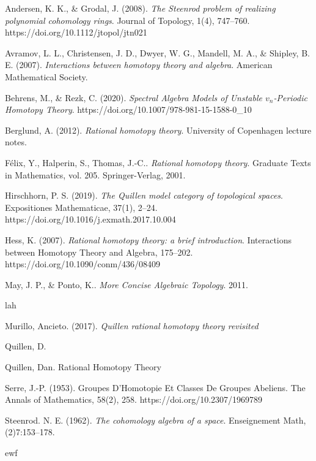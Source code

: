 \documentclass[psamsfonts]{amsart}
\theoremstyle{definition}
\numberwithin{equation}{section}
\begin{document}
\newpage
\begin{thebibliography}{9}

Andersen, K. K., \& Grodal, J. (2008). \textit{The Steenrod problem of realizing polynomial cohomology rings}. Journal of Topology, 1(4), 747–760. https://doi.org/10.1112/jtopol/jtn021 

Avramov, L. L., Christensen, J. D., Dwyer, W. G., Mandell, M. A., \& Shipley, B. E. (2007). \textit{Interactions between homotopy theory and algebra}. American Mathematical Society.

Behrens, M., \& Rezk, C. (2020). \textit{Spectral Algebra Models of Unstable $v_n$-Periodic Homotopy Theory}. https://doi.org/10.1007/978-981-15-1588-0\_10 

Berglund, A. (2012). \textit{Rational homotopy theory}. University of Copenhagen lecture notes.


Félix, Y., Halperin, S., Thomas, J.-C.. \textit{Rational homotopy theory}. Graduate Texts in Mathematics, vol. 205. Springer-Verlag, 2001.


Hirschhorn, P. S. (2019). \textit{The Quillen model category of topological spaces}. Expositiones Mathematicae, 37(1), 2–24. https://doi.org/10.1016/j.exmath.2017.10.004 

Hess, K. (2007). \textit{Rational homotopy theory: a brief introduction}. Interactions between Homotopy Theory and Algebra, 175–202. https://doi.org/10.1090/conm/436/08409

May, J. P., \& Ponto, K.. \textit{More Concise Algebraic Topology}. 2011.

 lah

 Murillo, Ancieto. (2017). \textit{Quillen rational homotopy theory revisited}

 Quillen, D.

 Quillen, Dan. Rational Homotopy Theory

Serre, J.-P. (1953). Groupes D'Homotopie Et Classes De Groupes Abeliens. The Annals of Mathematics, 58(2), 258. https://doi.org/10.2307/1969789 

Steenrod. N. E. (1962). \textit{The cohomology algebra of a space}. Enseignement Math, (2)7:153–178.

 ewf

\end{thebibliography}
\end{document}
